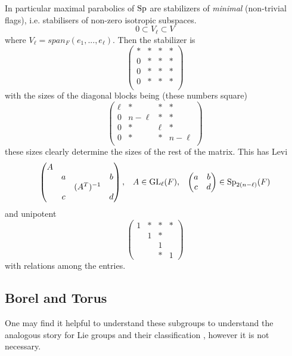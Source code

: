     In particular maximal parabolics of \(\operatorname{Sp}\) are stabilizers of \textit{minimal} (non-trivial flags), i.e. stabilisers of non-zero isotropic subspaces.
    \[0 \subset V_\ell \subset V\]
    where \(V_\ell = span_F(e_1, ..., e_\ell)\). Then the stabilizer is 
    \[\begin{pmatrix}
        * &*&*&* \\
        0 &*&*&* \\
        0 &*&*&* \\
        0 &*&*&* \\
    \end{pmatrix}\]
    with the sizes of the diagonal blocks being (these numbers square)
    \[\begin{pmatrix}
        \ell &*&*&* \\
        0 &n-\ell&*&* \\
        0 &*&\ell&* \\
        0 &*&*&n-\ell \\
    \end{pmatrix}\]
    these sizes clearly determine the sizes of the rest of the matrix. This has Levi
    \[\begin{pmatrix}
        A &&& \\
         &a&&b \\
         &&(A^T)^{-1}& \\
         &c&&d \\
    \end{pmatrix}, \;\;\; A\in \operatorname{GL}_\ell(F), \;\;\; \begin{pmatrix}
        a & b\\
        c & d \\
    \end{pmatrix} \in \operatorname{Sp}_{2(n-\ell)}(F)\]
    and unipotent 
    \[\begin{pmatrix}
        1 &*&*&* \\
        & 1&*& \\
        && 1& \\
        &&*&1
    \end{pmatrix}\]
    with relations among the entries.

    \subsection{Borel and Torus}
    One may find it helpful to understand these subgroups to understand the analogous story for Lie groups and their classification \cite{hallLieGroupsLie2015}, however it is not necessary. 

